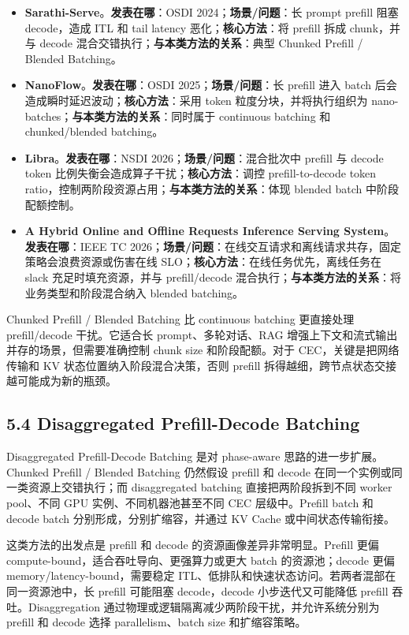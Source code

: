 \documentclass[a4paper,twocolumn,10pt]{ctexart}
\begin{document}
\begin{itemize}
\item \textbf{Sarathi-Serve}。\textbf{发表在哪}：OSDI 2024；\textbf{场景/问题}：长 prompt prefill 阻塞 decode，造成 ITL 和 tail latency 恶化；\textbf{核心方法}：将 prefill 拆成 chunk，并与 decode 混合交错执行；\textbf{与本类方法的关系}：典型 Chunked Prefill / Blended Batching。
\item \textbf{NanoFlow}。\textbf{发表在哪}：OSDI 2025；\textbf{场景/问题}：长 prefill 进入 batch 后会造成瞬时延迟波动；\textbf{核心方法}：采用 token 粒度分块，并将执行组织为 nano-batches；\textbf{与本类方法的关系}：同时属于 continuous batching 和 chunked/blended batching。
\item \textbf{Libra}。\textbf{发表在哪}：NSDI 2026；\textbf{场景/问题}：混合批次中 prefill 与 decode token 比例失衡会造成算子干扰；\textbf{核心方法}：调控 prefill-to-decode token ratio，控制两阶段资源占用；\textbf{与本类方法的关系}：体现 blended batch 中阶段配额控制。
\item \textbf{A Hybrid Online and Offline Requests Inference Serving System}。\textbf{发表在哪}：IEEE TC 2026；\textbf{场景/问题}：在线交互请求和离线请求共存，固定策略会浪费资源或伤害在线 SLO；\textbf{核心方法}：在线任务优先，离线任务在 slack 充足时填充资源，并与 prefill/decode 混合执行；\textbf{与本类方法的关系}：将业务类型和阶段混合纳入 blended batching。
\end{itemize}





Chunked Prefill / Blended Batching 比 continuous batching 更直接处理 prefill/decode 干扰。它适合长 prompt、多轮对话、RAG 增强上下文和流式输出并存的场景，但需要准确控制 chunk size 和阶段配额。对于 CEC，关键是把网络传输和 KV 状态位置纳入阶段混合决策，否则 prefill 拆得越细，跨节点状态交接越可能成为新的瓶颈。


\subsection{5.4 Disaggregated Prefill-Decode Batching}

Disaggregated Prefill-Decode Batching 是对 phase-aware 思路的进一步扩展。Chunked Prefill / Blended Batching 仍然假设 prefill 和 decode 在同一个实例或同一类资源上交错执行；而 disaggregated batching 直接把两阶段拆到不同 worker pool、不同 GPU 实例、不同机器池甚至不同 CEC 层级中。Prefill batch 和 decode batch 分别形成，分别扩缩容，并通过 KV Cache 或中间状态传输衔接。


这类方法的出发点是 prefill 和 decode 的资源画像差异非常明显。Prefill 更偏 compute-bound，适合吞吐导向、更强算力或更大 batch 的资源池；decode 更偏 memory/latency-bound，需要稳定 ITL、低排队和快速状态访问。若两者混部在同一资源池中，长 prefill 可能阻塞 decode，decode 小步迭代又可能降低 prefill 吞吐。Disaggregation 通过物理或逻辑隔离减少两阶段干扰，并允许系统分别为 prefill 和 decode 选择 parallelism、batch size 和扩缩容策略。
\end{document}
